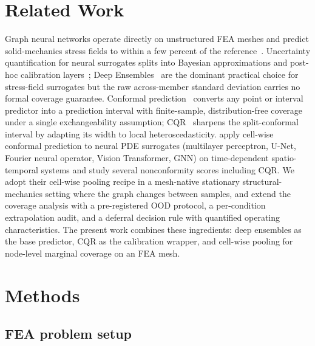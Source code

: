 \documentclass{article}
\begin{document}
\section{Related Work}

Graph neural networks operate directly on unstructured FEA meshes and
predict solid-mechanics stress fields to within a few percent of the
reference~\citep{maurizi2022gnn, pfaff2021meshgraphnets,
gladstone2024gnn}. Uncertainty quantification for neural surrogates
splits into Bayesian approximations and post-hoc calibration
layers~\citep{psaros2023uq}; Deep
Ensembles~\citep{lakshminarayanan2017ensembles} are the dominant
practical choice for stress-field surrogates but the raw across-member
standard deviation carries no formal coverage guarantee. Conformal
prediction~\citep{angelopoulos2023conformal} converts any point or
interval predictor into a prediction interval with finite-sample,
distribution-free coverage under a single exchangeability assumption;
CQR~\citep{romano2019cqr} sharpens the split-conformal interval by
adapting its width to local heteroscedasticity.
\citet{gopakumar2024conformal} apply cell-wise conformal prediction to
neural PDE surrogates (multilayer perceptron, U-Net, Fourier neural operator, Vision Transformer, GNN) on time-dependent
spatio-temporal systems and study several nonconformity scores
including CQR. We adopt their cell-wise pooling recipe in a mesh-native
stationary structural-mechanics setting where the graph changes between
samples, and extend the coverage analysis with a pre-registered OOD
protocol, a per-condition extrapolation audit, and a deferral decision
rule with quantified operating characteristics. The present work
combines these ingredients: deep ensembles as the base predictor, CQR
as the calibration wrapper, and cell-wise pooling for node-level
marginal coverage on an FEA mesh.

\section{Methods}

\subsection{FEA problem setup}
\end{document}
